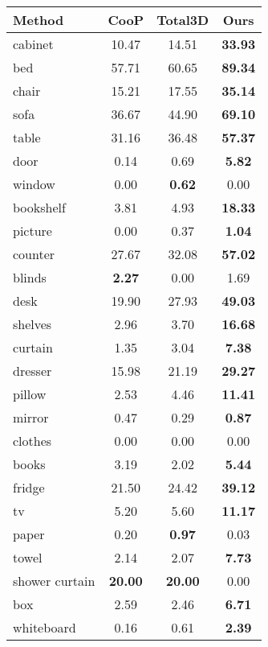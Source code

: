 \documentclass[final]{cvpr}
\begin{document}
\begin{table}[!ht]
	\begin{center}
		\begin{tabular}{l|c|c|c}
			Method & CooP \cite{huang2018cooperative} & Total3D \cite{nie2020total3dunderstanding} & Ours \\
			\hline
			cabinet & 10.47 & 14.51 & \textbf{33.93} \\
			bed & 57.71 & 60.65 & \textbf{89.34} \\
			chair & 15.21 & 17.55 & \textbf{35.14} \\
			sofa & 36.67 & 44.90 & \textbf{69.10} \\
			table & 31.16 & 36.48 & \textbf{57.37} \\
			door & 0.14 & 0.69 & \textbf{5.82} \\
			window & 0.00 & \textbf{0.62} & 0.00 \\
			bookshelf & 3.81 & 4.93 & \textbf{18.33} \\
			picture & 0.00 & 0.37 & \textbf{1.04} \\
			counter & 27.67 & 32.08 & \textbf{57.02} \\
            blinds & \textbf{2.27} & 0.00 & 1.69 \\
            desk & 19.90 & 27.93 & \textbf{49.03} \\
            shelves & 2.96 & 3.70 & \textbf{16.68} \\
            curtain & 1.35 & 3.04 & \textbf{7.38} \\
            dresser & 15.98 & 21.19 & \textbf{29.27} \\
            pillow & 2.53 & 4.46 & \textbf{11.41} \\
            mirror & 0.47 & 0.29 & \textbf{0.87} \\
            clothes & 0.00 & 0.00 & 0.00 \\
            books & 3.19 & 2.02 & \textbf{5.44} \\
			fridge & 21.50 & 24.42 & \textbf{39.12} \\
			tv & 5.20 & 5.60 & \textbf{11.17} \\
			paper & 0.20 & \textbf{0.97} & 0.03 \\
			towel & 2.14 & 2.07 & \textbf{7.73} \\
			shower curtain & \textbf{20.00} & \textbf{20.00} & 0.00 \\
			box & 2.59 & 2.46 & \textbf{6.71} \\
			whiteboard & 0.16 & 0.61 & \textbf{2.39} \\

\end{tabular}
\end{center}
\end{table}
\end{document}
